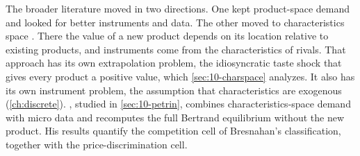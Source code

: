 The broader literature moved in two directions. One kept product-space demand and looked for better
instruments and data. The other moved to characteristics space \citep{Berry1994,BerryLevinsohnPakes1995}.
There the value of a new product depends on its location relative to existing products, and instruments come
from the characteristics of rivals. That approach has its own extrapolation problem, the idiosyncratic
taste shock that gives every product a positive value, which \cref{sec:10-charspace} analyzes. It also has its
own instrument problem, the assumption that characteristics are exogenous (\cref{ch:discrete}).
\citet{Petrin2002}, studied in \cref{sec:10-petrin}, combines characteristics-space demand with micro data and
recomputes the full Bertrand equilibrium without the new product. His results quantify the competition cell of
Bresnahan's classification, together with the price-discrimination cell.
